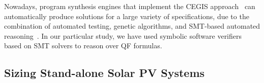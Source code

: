 \documentclass[10pt,conference]{IEEEtran}
\begin{document}
Nowadays, program synthesis engines that implement the CEGIS approach~\cite{sketch} can automatically produce solutions for a large variety of specifications, due to the combination of automated testing, genetic algorithms, and SMT-based automated reasoning~\cite{Sharma14}. In our particular study, we have used symbolic software verifiers based on SMT solvers to reason over QF formulas.%
%
\subsection{Sizing Stand-alone Solar PV Systems}
\label{sec:sizing}
\end{document}
